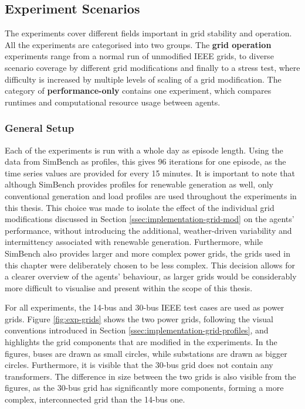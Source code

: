 \subsection{Experiment Scenarios}\label{ssec:experiment-scenarios}
The experiments cover different fields important in grid stability and operation. All the experiments are categorised into two groups. The \textbf{grid operation} experiments range from a normal run of unmodified IEEE grids, to diverse scenario coverage by different grid modifications and finally to a stress test, where difficulty is increased by multiple levels of scaling of a grid modification. The category of \textbf{performance-only} contains one experiment, which compares runtimes and computational resource usage between agents.

\subsubsection{General Setup}
Each of the experiments is run with a whole day as episode length. Using the data from SimBench as profiles, this gives 96 iterations for one episode, as the time series values are provided for every 15 minutes. It is important to note that although SimBench provides profiles for renewable generation as well, only conventional generation and load profiles are used throughout the experiments in this thesis. This choice was made to isolate the effect of the individual grid modifications discussed in Section \ref{ssec:implementation-grid-mod} on the agents' performance, without introducing the additional, weather-driven variability and intermittency associated with renewable generation. Furthermore, while SimBench also provides larger and more complex power grids, the grids used in this chapter were deliberately chosen to be less complex. This decision allows for a clearer overview of the agents' behaviour, as larger grids would be considerably more difficult to visualise and present within the scope of this thesis.

For all experiments, the 14-bus and 30-bus IEEE test cases are used as power grids. Figure \ref{fig:exp-grids} shows the two power grids, following the visual conventions introduced in Section \ref{ssec:implementation-grid-profiles}, and highlights the grid components that are modified in the experiments. In the figures, buses are drawn as small circles, while substations are drawn as bigger circles. Furthermore, it is visible that the 30-bus grid does not contain any transformers. The difference in size between the two grids is also visible from the figures, as the 30-bus grid has significantly more components, forming a more complex, interconnected grid than the 14-bus one.

